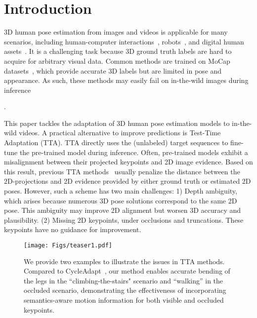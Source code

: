 \section{Introduction}
\label{sec:intro}

3D human pose estimation from images and videos is applicable for many scenarios, including human-computer interactions~\cite{zheng2023realistic}, robots~\cite{gong2022posetriplet}, and digital human assets~\cite{moon2024expressive}. 
It is a challenging task because 3D ground truth labels are hard to acquire for arbitrary visual data. Common methods are trained on MoCap datasets~{\cite{mahmood2019amass}}, which provide accurate 3D labels but are limited in pose and appearance.  As such, these methods may easily fail on in-the-wild images during inference~{\cite{boa,iso,DAPA,cycleadapt}. 

This paper tackles the adaptation of 3D human pose estimation models to in-the-wild videos. 
A practical alternative to improve predictions is Test-Time Adaptation (TTA).  TTA directly uses the (unlabeled) target sequences
to fine-tune the pre-trained model during inference.
{Often, pre-trained models exhibit a misalignment between their projected keypoints and 2D image evidence.}
Based on this result, previous TTA methods~\cite{dynaboa, cycleadapt} usually penalize the distance between the 2D-projections and 2D evidence provided by either ground truth or estimated 2D poses. 
However,
such a scheme has two main challenges: 1) Depth ambiguity, which arises because 
{numerous 3D pose solutions correspond to the same 2D pose.} This ambiguity may improve 2D alignment but worsen 3D accuracy and plausibility. (2) Missing 2D keypoints, 
\eg under occlusions and truncations.  These keypoints have no guidance for improvement.


\begin{figure}[!t]
    \centering
        \texttt{[image: Figs/teaser1.pdf]}
    \caption{We provide two examples to illustrate the issues in TTA methods. Compared to CycleAdapt~\cite{cycleadapt}, our method enables accurate bending of the legs in the ``climbing-the-stairs" scenario and ``walking'' in the occluded scenario, demonstrating the effectiveness of incorporating semantics-aware motion information for both visible and occluded keypoints.
    }
    \label{fig:teaser}
    \vspace{-0.2cm}
\end{figure}

}
